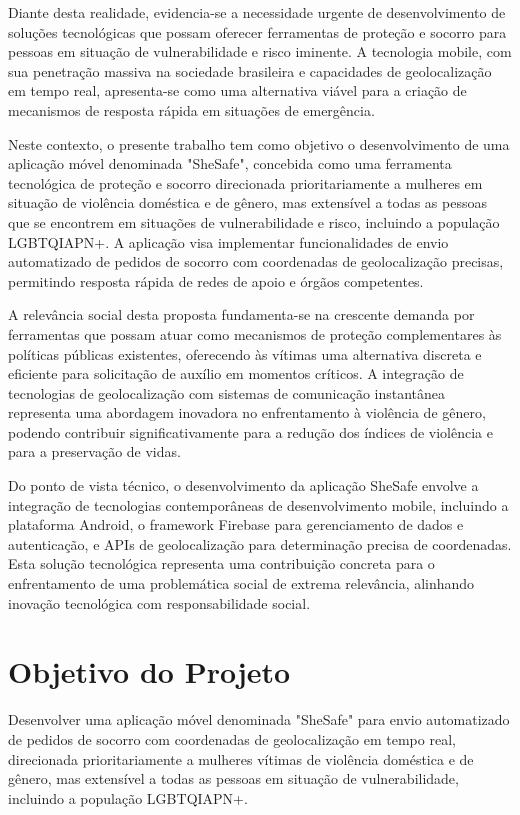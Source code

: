 Diante desta realidade, evidencia-se a necessidade urgente de desenvolvimento de soluções tecnológicas que possam oferecer ferramentas de proteção e socorro para pessoas em situação de vulnerabilidade e risco iminente. A tecnologia mobile, com sua penetração massiva na sociedade brasileira e capacidades de geolocalização em tempo real, apresenta-se como uma alternativa viável para a criação de mecanismos de resposta rápida em situações de emergência.

Neste contexto, o presente trabalho tem como objetivo o desenvolvimento de uma aplicação móvel denominada "SheSafe", concebida como uma ferramenta tecnológica de proteção e socorro direcionada prioritariamente a mulheres em situação de violência doméstica e de gênero, mas extensível a todas as pessoas que se encontrem em situações de vulnerabilidade e risco, incluindo a população LGBTQIAPN+. A aplicação visa implementar funcionalidades de envio automatizado de pedidos de socorro com coordenadas de geolocalização precisas, permitindo resposta rápida de redes de apoio e órgãos competentes.

A relevância social desta proposta fundamenta-se na crescente demanda por ferramentas que possam atuar como mecanismos de proteção complementares às políticas públicas existentes, oferecendo às vítimas uma alternativa discreta e eficiente para solicitação de auxílio em momentos críticos. A integração de tecnologias de geolocalização com sistemas de comunicação instantânea representa uma abordagem inovadora no enfrentamento à violência de gênero, podendo contribuir significativamente para a redução dos índices de violência e para a preservação de vidas.

Do ponto de vista técnico, o desenvolvimento da aplicação SheSafe envolve a integração de tecnologias contemporâneas de desenvolvimento mobile, incluindo a plataforma Android, o framework Firebase para gerenciamento de dados e autenticação, e APIs de geolocalização para determinação precisa de coordenadas. Esta solução tecnológica representa uma contribuição concreta para o enfrentamento de uma problemática social de extrema relevância, alinhando inovação tecnológica com responsabilidade social.

\section{Objetivo do Projeto}
Desenvolver uma aplicação móvel denominada "SheSafe" para envio automatizado de pedidos de socorro com coordenadas de geolocalização em tempo real, direcionada prioritariamente a mulheres vítimas de violência doméstica e de gênero, mas extensível a todas as pessoas em situação de vulnerabilidade, incluindo a população LGBTQIAPN+.

